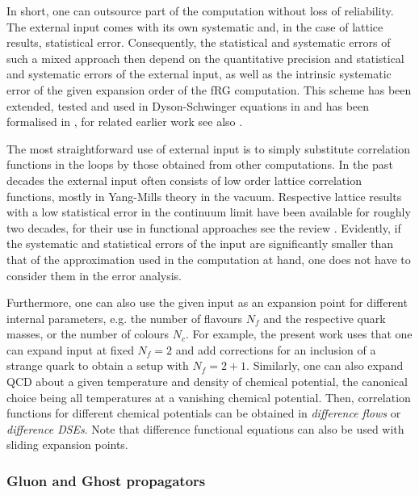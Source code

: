 \documentclass[aps,twocolumn,prd,superscriptaddress]{revtex4-2}
\begin{document}
In short, one can outsource part of the computation without loss of reliability. The external input comes with its own systematic and, in the case of lattice results, statistical error. Consequently, the statistical and systematic errors of such a mixed approach then depend on the quantitative precision and statistical and systematic errors of the external input, as well as the intrinsic systematic error of the given expansion order of the fRG computation. This scheme has been extended, tested and used in Dyson-Schwinger equations in \cite{Gao:2020fbl, Gao:2020qsj, Gao:2021wun,Gao:2021vsf} and has been formalised in \cite{Lu:2023mkn}, for related earlier work see also \cite{Fister:2011uw, Fischer:2011mz, Fischer:2012vc, Fischer:2014ata}.

The most straightforward use of external input is to simply substitute correlation functions in the loops 
by those obtained from other computations. In the past decades the external input often consists of low order lattice correlation functions, mostly in Yang-Mills theory in the vacuum. Respective lattice results with a low statistical error in the continuum limit have been available for roughly two decades, for their use in functional approaches see the review \cite{Dupuis:2020fhh}. Evidently, if the systematic and statistical errors of the input are significantly smaller than that of the approximation used in the computation at hand, one does not have to consider them in the error analysis.

Furthermore, one can also use the given input as an expansion point for different internal parameters, e.g. the number of flavours $N_f$ and the respective quark masses, or the number of colours $N_c$. For example, the present work uses that one can expand input at fixed $N_f = 2$ and add corrections for an inclusion of a strange quark to obtain a setup with $N_f = 2+1$.
Similarly, one can also expand QCD about a given temperature and density of chemical potential, the canonical choice being all temperatures at a vanishing chemical potential. Then, correlation functions for different chemical potentials can be obtained in \textit{difference flows} or \textit{difference DSEs}. Note that difference functional equations can also be used with sliding expansion points. 


\subsubsection{Gluon and Ghost propagators}
\label{sec:GluonGhost}
\end{document}
